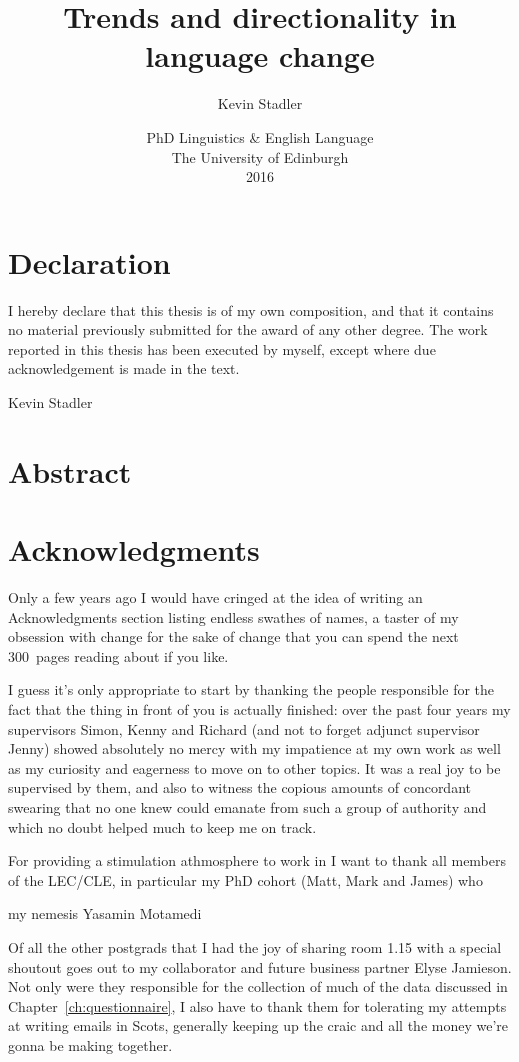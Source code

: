 \documentclass[oneside]{book}
\author{Kevin Stadler}
\title{Trends and directionality in language change}
\date{\vfill PhD Linguistics \& English Language\\
The University of Edinburgh\\
2016}
\begin{document}
\frontmatter

\maketitle

\chapter{Declaration}
I hereby declare that this thesis is of my own composition, and that it contains no material previously submitted for the award of any other degree. The work reported in this thesis has been executed by myself, except where due
acknowledgement is made in the text.

Kevin Stadler

\chapter{Abstract}


\chapter{Acknowledgments}

Only a few years ago I would have cringed at the idea of writing an Acknowledgments section listing endless swathes of names, a taster of my obsession with change for the sake of change that you can spend the next 300~pages reading about if you like.

I guess it's only appropriate to start by thanking the people responsible for the fact that the thing in front of you is actually finished: over the past four years my supervisors Simon, Kenny and Richard (and not to forget adjunct supervisor Jenny) showed absolutely no mercy with my impatience at my own work as well as my curiosity and eagerness to move on to other topics. It was a real joy to be supervised by them, and also to witness the copious amounts of concordant swearing that no one knew could emanate from such a group of authority and which no doubt helped much to keep me on track.

For providing a stimulation athmosphere to work in I want to thank all members of the LEC/CLE, in particular my PhD cohort (Matt, Mark and James) who 

my nemesis Yasamin Motamedi

Of all the other postgrads that I had the joy of sharing room 1.15 with a special shoutout goes out to my collaborator and future business partner Elyse Jamieson. Not only were they responsible for the collection of much of the data discussed in Chapter~\ref{ch:questionnaire}, I also have to thank them for tolerating my attempts at writing emails in Scots, generally keeping up the craic and all the money we're gonna be making together.
\end{document}
